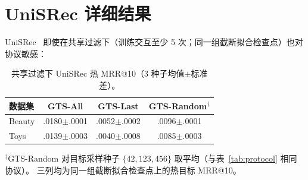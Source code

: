 \documentclass[sigconf,natbib=true,anonymous]{acmart}
\begin{document}
\section{UniSRec 详细结果}
\label{app:unisrec}

UniSRec~\cite{hou2022unisrec} 即使在共享过滤下（训练交互至少 5 次；同一组截断拟合检查点）也对协议敏感：

\begin{table}[H]
\centering
\caption{共享过滤下 UniSRec 热 MRR@10（3 种子均值$\pm$标准差）。}
\label{tab:unisrec-app}
\small
\begin{tabular}{@{}lccc@{}}
\toprule
数据集 & GTS-All & GTS-Last & GTS-Random$^\dagger$ \\
\midrule
Beauty & .0180$\pm$.0001 & .0052$\pm$.0002 & .0096$\pm$.0001 \\
Toys   & .0139$\pm$.0003 & .0040$\pm$.0008 & .0085$\pm$.0003 \\
\bottomrule
\end{tabular}
\end{table}

\noindent$^\dagger$GTS-Random 对目标采样种子 $\{42,123,456\}$ 取平均（与表~\ref{tab:protocol} 相同协议）。
三列均为同一组截断拟合检查点上的热目标 MRR@10。

\balance

\begingroup
\raggedbottom
{}

\endgroup
\end{document}
